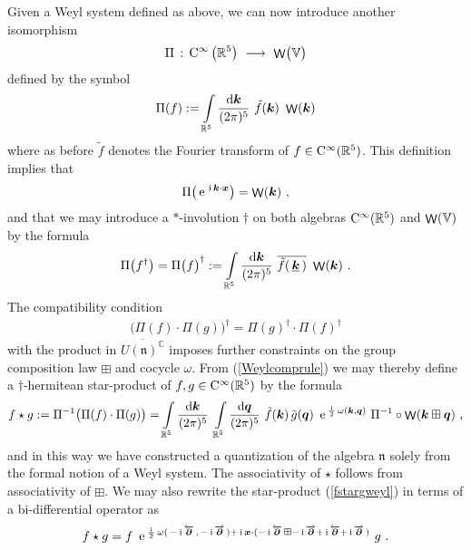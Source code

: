 \documentclass[11pt,a4paper]{article}
\DeclareMathOperator{\weyl}{{\sf W}}                   %
\newcommand{\comp}{\boxplus}                            %
\newcommand{\mbf}[1]{{\boldsymbol {#1} }}
\def\ii{{\,{\rm i}\,}}
\def\dd{{\rm d}}
\def\CC{{\rm C}}
\def\mx{{\mbf x}}
\def\mk{{\mbf k}}
\def\mq{{\mbf q}}
\def\mfn{{\mathfrak n}}
\def\mbbV{{\mathbb V}}
\newcommand{\complex}{{\mathbb C}} %
\newcommand{\real}{{\mathbb R}} %
\def\e{{\,\rm e}\,}
\def\d{\partial}
\newcommand{\beq}{\begin{eqnarray}}
\newcommand{\eeq}{\end{eqnarray}}
\begin{document}
Given a Weyl system defined as above, we can now introduce
another isomorphism
\beq
\Pi\,:\,\CC^\infty\left(\real^5\right)~\longrightarrow~
\weyl\bigl(\mathbb{V}\bigr)
\label{Omegaquantmap}\eeq
defined by the symbol
\beq
\Pi(f):=\int\limits_{\real^5}\frac{\dd\mk}{(2\pi)^5}~
\tilde{f}(\mk)~\weyl(\mk)
\label{Omegafdef}\eeq
where as before $\tilde f$ denotes the Fourier transform of
$f\in\CC^\infty(\real^5)$. This definition implies that
\beq
\Pi\bigl(\e^{\ii\mk\cdot\mx}\bigr)=\weyl(\mk) \ ,
\label{weylmkDelta}\eeq
and that we may introduce a $*$-involution $\dag$ on both algebras
$\CC^\infty(\real^5)$ and $\weyl(\mbbV)$ by the formula
\beq
\Pi\bigl(f^\dag\bigr)=\Pi\bigl(f\bigr)^\dag:=
\int\limits_{\real^5}\frac{\dd\mk}{(2\pi)^5}~\overline{
\tilde f(\,\underline{\mk}\,)}~\weyl(\mk) \ .
\label{involdef}\eeq
The compatibility condition
\beq
\bigl(\Pi(f)\cdot\Pi(g)\bigr)^\dag=\Pi(g)^\dag\cdot
\Pi(f)^\dag
\label{compconddag}\eeq
with the product in $\overline{U(\mfn)^\complex}$ imposes further
constraints on the group composition law $\comp$ and cocycle $\omega$. From
(\ref{Weylcomprule}) we may thereby define a $\dag$-hermitean
star-product of $f,g\in\CC^\infty(\real^5)$ by the formula
\beq
f\star g:=\Pi^{-1}\bigl(\Pi(f)\cdot\Pi(g)\bigr)
=\int\limits_{\real^5}\frac{\dd\mk}{(2\pi)^5}~
\int\limits_{\real^5}\frac{\dd\mq}{(2\pi)^5}~\tilde f(\mk)\,
\tilde g(\mq)~\e^{\frac\ii2\,\omega(\mk,\mq)}~
\Pi^{-1}\circ\weyl(\mk\comp\mq) \ ,
\label{fstargweyl}\eeq
and in this way we have constructed a quantization of the
algebra $\mfn$ solely from the formal notion of a Weyl system.
The associativity of $\star$ follows from associativity of
$\comp$. We may also rewrite the star-product (\ref{fstargweyl}) in
terms of a bi-differential operator as
\beq
f\star g=f~\e^{\frac\ii2\,\omega(\,-\ii\overleftarrow{\mbf\d}\,,\,
-\ii\overrightarrow{\mbf\d}\,)+\ii\mx\cdot(-\ii\overleftarrow{\mbf\d}\,\comp
-\ii\overrightarrow{\mbf\d}+\ii\overleftarrow{\mbf\d}+\ii
\overrightarrow{\mbf\d}\,)}~g \ .
\label{bidiffweyl}\eeq
\end{document}
